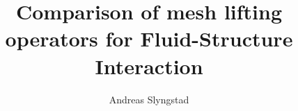 \documentclass[a4paper, twoside,openright ,titlepage, 12pt]{book}
\title{Comparison of mesh lifting operators for Fluid-Structure Interaction}
\author{Andreas Slyngstad}
\begin{document}
                                                                                                                          
\masterfrontpage

\tableofcontents
\newtheorem{theorem}{Theorem}[section]
\newtheorem{lemma}[theorem]{Lemma}

%
%
%
%

%
%




\end{document}
